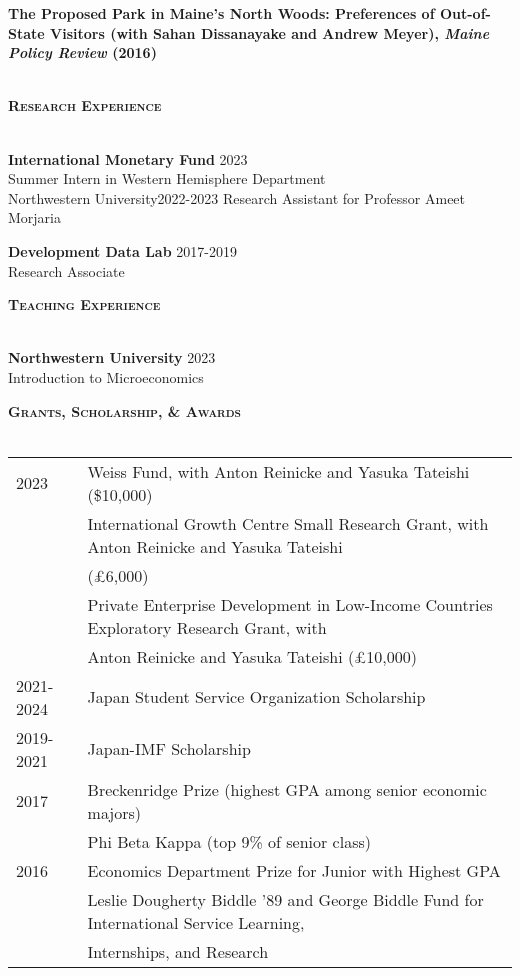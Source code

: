 \documentclass[11pt]{article}
\newcommand{\lineunder}{\vspace*{-8pt} \\ \hspace*{-18pt} \hrulefill \\}
\newcommand{\header}[1]{{\hspace*{-15pt}\vspace*{6pt} \textsc{#1}} \vspace*{-6pt} \lineunder}
\newcommand{\schoolwithcourses}[4]{
 \textbf{#1} \hfill{#2}\\
    #3\\
\vspace*{5pt}
}
\begin{document}
\schoolwithcourses{The Proposed Park in Maine's North Woods: Preferences of Out-of-State Visitors \textnormal{(with Sahan Dissanayake and Andrew Meyer), \textit{Maine Policy Review} (2016)}}{}{~\vspace{0mm}} 
\hfill{}


\header{\textbf{Research Experience}}
\vspace{2mm}
\schoolwithcourses{International Monetary Fund}{2023}{\hspace{2mm} Summer Intern in Western Hemisphere Department}

\schoolwithcourses{Northwestern University}{2022-2023}{\hspace{2mm} Research Assistant for Professor Ameet Morjaria}

\schoolwithcourses{Development Data Lab}{2017-2019}{\hspace{2mm} Research Associate}
\hfill{}
\vspace{3mm}


\header{\textbf{Teaching Experience}}
\vspace{2mm}
\schoolwithcourses{Northwestern University}{2023}{\hspace{2mm} Introduction to Microeconomics}
\hfill{}
\vspace{3mm}


\header{\textbf{Grants, Scholarship, \& Awards}}
\vspace{2mm}

\begin{tabular}{l @{\hspace{4.5ex}} l }
2023 & Weiss Fund, with Anton Reinicke and Yasuka Tateishi (\$10,000) \\
& International Growth Centre Small Research Grant, with Anton Reinicke and Yasuka Tateishi \\
& (£6,000) \\
& Private Enterprise Development in Low-Income Countries Exploratory Research Grant, with \\
 & Anton Reinicke and Yasuka Tateishi (£10,000) \\
2021-2024 & Japan Student Service Organization Scholarship \\
2019-2021 & Japan-IMF Scholarship \\
2017 & Breckenridge Prize (highest GPA among senior economic majors) \\
& Phi Beta Kappa (top 9\% of senior class) \\
2016 & Economics Department Prize for Junior with Highest GPA \\
& Leslie Dougherty Biddle '89 and George Biddle Fund for International Service Learning, \\
& Internships, and Research \\
\end{tabular}
\vspace{2mm}
\hfill{}
\end{document}
